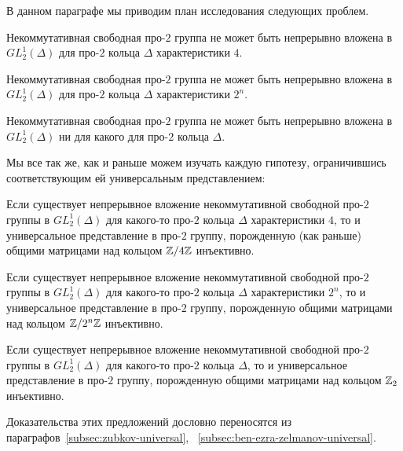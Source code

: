 В данном параграфе мы приводим план исследования следующих проблем.

\begin{conjecture}
    \label{conj:4}
    Некоммутативная свободная про-$2$ группа не может быть непрерывно вложена в $GL^1_2(\Delta)$ для про-$2$ кольца $\Delta$ характеристики $4$.
\end{conjecture}
\begin{conjecture}
    \label{conj:2^n}
    Некоммутативная свободная про-$2$ группа не может быть непрерывно вложена в $GL^1_2(\Delta)$ для про-$2$ кольца $\Delta$ характеристики $2^n$.
\end{conjecture}
\begin{conjecture}
    \label{conj:2_n}
    Некоммутативная свободная про-$2$ группа не может быть непрерывно вложена в $GL^1_2(\Delta)$ ни для какого для про-$2$ кольца $\Delta$.
\end{conjecture}
\vskip 0.1in\noindent

Мы все так же, как и раньше можем изучать каждую гипотезу, ограничившись соответствующим ей универсальным представлением:

\vskip 0.1in\noindent
\begin{proposition}
    Если существует непрерывное вложение некоммутативной свободной про-$2$ группы в $GL_2^1(\Delta)$ для какого-то про-$2$ кольца $\Delta$ характеристики $4$, то и универсальное представление в про-$2$ группу, порожденную (как раньше) общими матрицами над кольцом $\mathbb{Z}/4\mathbb{Z}$ инъективно.
\end{proposition}
\begin{proposition}
    Если существует непрерывное вложение некоммутативной свободной про-$2$ группы в $GL_2^1(\Delta)$ для какого-то про-$2$ кольца $\Delta$ характеристики $2^n$, то и универсальное представление в про-$2$ группу, порожденную общими матрицами над кольцом $\mathbb{Z}/2^n\mathbb{Z}$ инъективно.
\end{proposition}
\begin{proposition}
    Если существует непрерывное вложение некоммутативной свободной про-$2$ группы в $GL_2^1(\Delta)$ для какого-то про-$2$ кольца $\Delta$, то и универсальное представление в про-$2$ группу, порожденную общими матрицами над кольцом $\mathbb{Z}_2$ инъективно.
\end{proposition}
\vskip 0.1in\noindent

Доказательства этих предложений дословно переносятся из параграфов~\ref{subsec:zubkov-universal}, ~\ref{subsec:ben-ezra-zelmanov-universal}.

